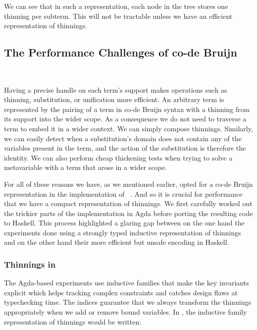 
We can see that in such a representation, each node in the tree stores one
thinning per subterm. This will not be tractable unless we have an efficient
representation of thinnings.


\subsection{The Performance Challenges of co-de Bruijn}~\label{sec:thinningsintypos}

Having a precise handle on each term's support makes operations such as thinning,
substitution, or unification more efficient.
%
An arbitrary term is represented by the pairing of a term in co-de Bruijn syntax
with a thinning from its support into the wider scope.
%
As a consequence we do not need to traverse a term to embed it in a wider context.
We can simply compose thinnings.
%
Similarly, we can easily detect when a substitution's domain does not contain any
of the variables present in the term, and the action of the substitution is therefore
the identity.
%
We can also perform cheap thickening tests when trying to solve a metavariable with
a term that arose in a wider scope.

For all of these reasons we have, as we mentioned earlier, opted for a co-de Bruijn
representation in the implementation of \typos~\cite{MANUAL:talk/types/Allais22}.
%
And so it is crucial for performance that we have a compact representation of thinnings.
%
We first carefully worked out the trickier parts of the implementation in Agda before
porting the resulting code to Haskell.
%
This process highlighted a glaring gap between on the one hand the experiments done
using a strongly typed inductive representation of thinnings and on the other hand
their more efficient but unsafe encoding in Haskell.

\subsubsection{Thinnings in \typos}

The Agda-based experiments use inductive families that make the key invariants
explicit which helps tracking complex constraints and catches design flaws at
typechecking time.
%
The indices guarantee that we always transform the thinnings appropriately when
we add or remove bound variables. In \idris{}, the inductive family representation
of thinnings would be written:

